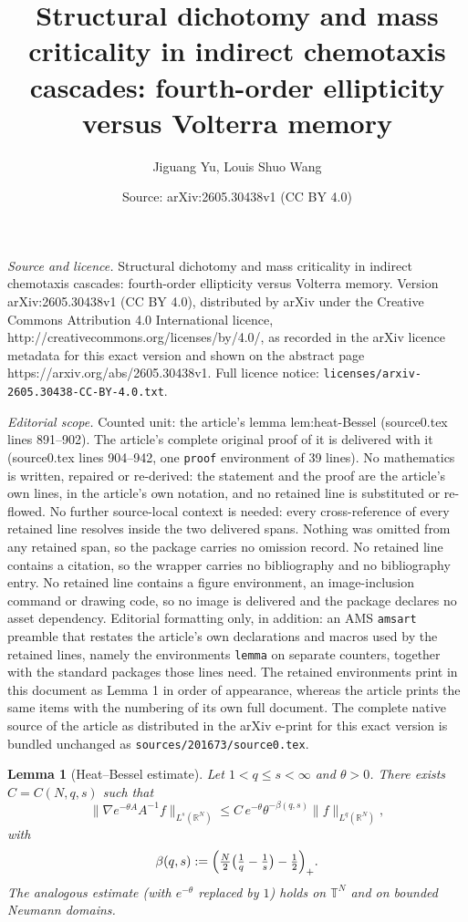 \documentclass[10pt,a4paper]{amsart}
\title{Structural dichotomy and mass criticality in indirect chemotaxis cascades: fourth-order ellipticity versus Volterra memory}
\author{Jiguang Yu, Louis Shuo Wang}
\date{Source: arXiv:2605.30438v1 (CC BY 4.0)}
\newtheorem{lemma}{Lemma}
\newcommand{\R}{\mathbb{R}}
\newcommand{\T}{\mathbb{T}}
\begin{document}
\maketitle

\noindent\emph{Source and licence.} Structural dichotomy and mass criticality in indirect chemotaxis cascades: fourth-order ellipticity versus Volterra memory. Version arXiv:2605.30438v1 (CC BY 4.0), distributed by arXiv under the Creative Commons Attribution 4.0 International licence, http://creativecommons.org/licenses/by/4.0/, as recorded in the arXiv licence metadata for this exact version and shown on the abstract page https://arxiv.org/abs/2605.30438v1. Full licence notice: \texttt{licenses/arxiv-2605.30438-CC-BY-4.0.txt}.\par\smallskip

\noindent\textit{Editorial scope.} Counted unit: the article's lemma lem:heat-Bessel (source0.tex lines 891--902). The article's complete original proof of it is delivered with it (source0.tex lines 904--942, one \texttt{proof} environment of 39 lines). No mathematics is written, repaired or re-derived: the statement and the proof are the article's own lines, in the article's own notation, and no retained line is substituted or re-flowed.  No further source-local context is needed: every cross-reference of every retained line resolves inside the two delivered spans.  Nothing was omitted from any retained span, so the package carries no omission record.  No retained line contains a citation, so the wrapper carries no bibliography and no bibliography entry.  No retained line contains a figure environment, an image-inclusion command or drawing code, so no image is delivered and the package declares no asset dependency.  Editorial formatting only, in addition: an AMS \texttt{amsart} preamble that restates the article's own declarations and macros used by the retained lines, namely the environments \texttt{lemma} on separate counters, together with the standard packages those lines need.  The retained environments print in this document as Lemma 1 in order of appearance, whereas the article prints the same items with the numbering of its own full document.  The complete native source of the article as distributed in the arXiv e-print for this exact version is bundled unchanged as \texttt{sources/201673/source0.tex}.
\begin{lemma}[Heat--Bessel estimate]\label{lem:heat-Bessel}
Let $1<q\le s<\infty$ and $\theta>0$. There exists $C=C(N,q,s)$ such that
\begin{equation}\label{eq:heat-Bessel}
        \|\nabla e^{-\theta A}A^{-1}f\|_{L^{s}(\R^{N})}
        \le C\,e^{-\theta}\theta^{-\beta(q,s)}\|f\|_{L^{q}(\R^{N})},
\end{equation}
with
\begin{equation}\label{eq:beta-qs}
        \beta(q,s):=\Bigl(\tfrac{N}{2}\bigl(\tfrac{1}{q}-\tfrac{1}{s}\bigr)-\tfrac{1}{2}\Bigr)_{+}.
\end{equation}
The analogous estimate (with $e^{-\theta}$ replaced by $1$) holds on $\T^{N}$ and on bounded Neumann domains.
\end{lemma}
\end{document}
